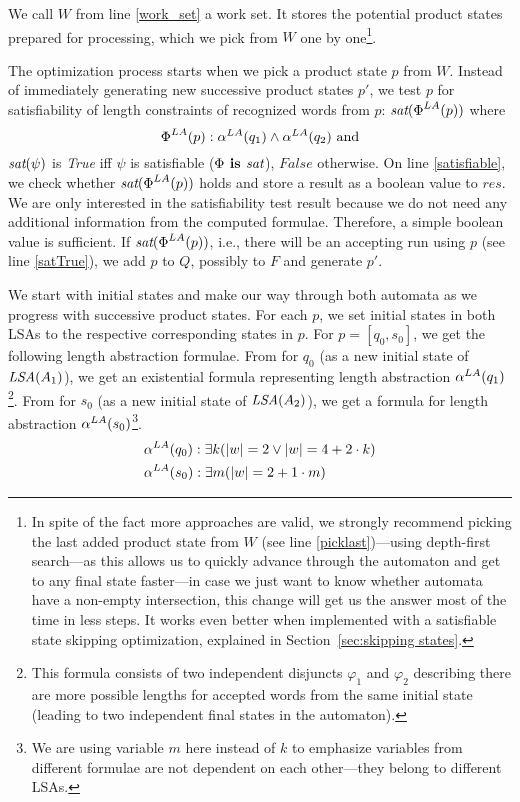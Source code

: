 We call $W$ from line \ref{work_set} a work set. It stores the potential product states prepared for processing, which we pick from $W$ one by one\footnote{In spite of the fact more approaches are valid, we strongly recommend picking the last added product state from $W$ (see line \ref{picklast})---using depth-first search---as this allows us to quickly advance through the automaton and get to any final state faster---in case we just want to know whether automata have a non-empty intersection, this change will get us the answer most of the time in less steps. It works even better when implemented with a satisfiable state skipping optimization, explained in Section~\ref{sec:skipping states}.}.

The optimization process starts when we pick a product state $p$ from $W$. Instead of immediately generating new successive product states $p'$, we test $p$ for satisfiability of length constraints of recognized words from $p$: $\emph{sat}(\emph{$\Phi$}^{LA}(p))$ where
\[
    \emph{$\Phi$}^{LA}(p) : \alpha^{LA}(q_1) \wedge \alpha^{LA}(q_2) \text{ and}
\]
$\emph{sat}(\psi)$ is \emph{True} iff $\psi$ is satisfiable ($\Phi \textbf{ is } \emph{sat}$), $False$ otherwise. On line \ref{satisfiable}, we check whether $\emph{sat}(\emph{$\Phi$}^{LA}(p))$ holds and store a result as a boolean value to $res$. We are only interested in the satisfiability test result because we do not need any additional information from the computed formulae. Therefore, a simple boolean value is sufficient. If $\emph{sat}(\emph{$\Phi$}^{LA}(p))$, i.e., there will be an accepting run using $p$ (see line \ref{satTrue}), we add $p$ to $Q$, possibly to $F$ and generate $p'$.

We start with initial states and make our way through both automata as we progress with successive product states. For each $p$, we set initial states in both LSAs to the respective corresponding states in $p$. For $p = [q_0, s_0]$, we get the following length abstraction formulae. From  for $q_0$ (as a new initial state of $\emph{LSA}(A_1)$), we get an existential formula representing length abstraction $\alpha^{LA}(q_1)$\footnote{This formula consists of two independent disjuncts $\varphi_1$ and $\varphi_2$ describing there are more possible lengths for accepted words from the same initial state (leading to two independent final states in the automaton).}. From  for $s_0$ (as a new initial state of $\emph{LSA}(A_2)$), we get a formula for length abstraction $\alpha^{LA}(s_0)$\footnote{We are using variable $m$ here instead of $k$ to emphasize variables from different formulae are not dependent on each other---they belong to different LSAs.}.
\begin{align*}
    &\alpha^{LA}(q_0): \exists k ( |w| = 2 \lor |w| = 4 + 2 \cdot k ) \\
    &\alpha^{LA}(s_0): \exists m ( |w| = 2 + 1 \cdot m )
\end{align*}

